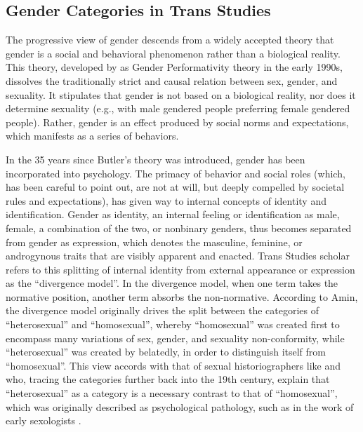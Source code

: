 \documentclass[11pt]{article}
\begin{document}
\subsection{Gender Categories in Trans Studies}
The progressive view of gender descends from a widely accepted theory that gender is a social and behavioral phenomenon rather than a biological reality. This theory, developed by \citet{butler:1990} as Gender Performativity theory in the early 1990s, dissolves the traditionally strict and causal relation between sex, gender, and sexuality. It stipulates that gender is not based on a biological reality, nor does it determine sexuality (e.g., with male gendered people preferring female gendered people). Rather, gender is an effect produced by social norms and expectations, which manifests as a series of behaviors.

In the 35 years since Butler’s theory was introduced, gender has been incorporated into psychology. The primacy of behavior and social roles (which, \citet{butler:1993} has been careful to point out, are not at will, but deeply compelled by societal rules and expectations), has given way to internal concepts of identity and identification. Gender as identity, an internal feeling or identification as male, female, a combination of the two, or nonbinary genders, thus becomes separated from gender as expression, which denotes the masculine, feminine, or androgynous traits that are visibly apparent and enacted. Trans Studies scholar \citet{amin:2022} refers to this splitting of internal identity from external appearance or expression as the “divergence model”.  In the divergence model, when one term takes the normative position, another term absorbs the non-normative. According to Amin, the divergence model originally drives the split between the categories of “heterosexual” and “homosexual”, whereby “homosexual” was created first to encompass many variations of sex, gender, and sexuality non-conformity, while “heterosexual” was created by belatedly, in order to distinguish itself from “homosexual”. This view accords with that of sexual historiographers like \citet{foucault:1978} and \citet{halperin:2002} who, tracing the categories further back into the 19th century, explain that “heterosexual” as a category is a necessary contrast to that of “homosexual”, which was originally described as psychological pathology, such as in the work of early sexologists \citep{krafft-ebing:2021,ellis:1900}.
\end{document}
